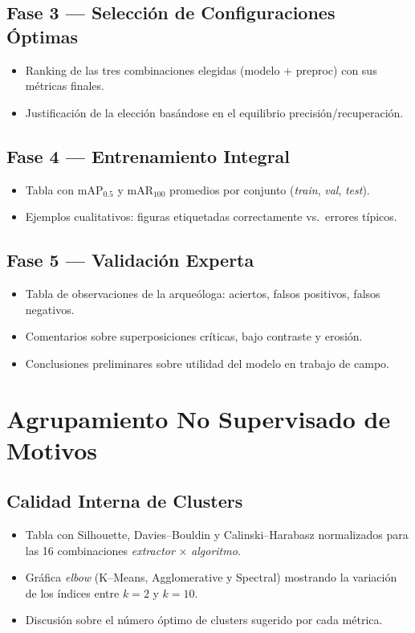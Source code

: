 \subsection{Fase 3 — Selección de Configuraciones Óptimas}
\begin{itemize}
  \item Ranking de las tres combinaciones elegidas (modelo + preproc) con sus métricas finales.
  \item Justificación de la elección basándose en el equilibrio precisión/recuperación.
\end{itemize}

\subsection{Fase 4 — Entrenamiento Integral}
\begin{itemize}
  \item Tabla con mAP$_{0.5}$ y mAR$_{100}$ promedios por conjunto (\textit{train}, \textit{val}, \textit{test}).
  \item Ejemplos cualitativos: figuras etiquetadas correctamente vs.\ errores típicos.
\end{itemize}

\subsection{Fase 5 — Validación Experta}
\begin{itemize}
  \item Tabla de observaciones de la arqueóloga: aciertos, falsos positivos, falsos negativos.
  \item Comentarios sobre superposiciones críticas, bajo contraste y erosión.
  \item Conclusiones preliminares sobre utilidad del modelo en trabajo de campo.
\end{itemize}

\section{Agrupamiento No Supervisado de Motivos}

\subsection{Calidad Interna de Clusters}
\begin{itemize}
  \item Tabla con Silhouette, Davies–Bouldin y Calinski–Harabasz normalizados para las 16 combinaciones \textit{extractor} × \textit{algoritmo}.
  \item Gráfica \textit{elbow} (K–Means, Agglomerative y Spectral) mostrando la variación de los índices entre $k=2$ y $k=10$.
  \item Discusión sobre el número óptimo de clusters sugerido por cada métrica.
\end{itemize}

